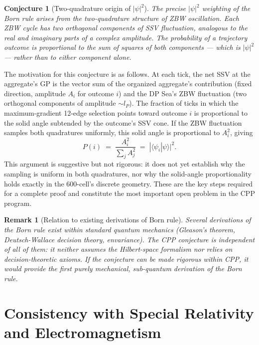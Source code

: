 \documentclass[12pt]{article}
\newtheorem{conjecture}[theorem]{Conjecture}
\newtheorem{remark}[theorem]{Remark}
\newcommand{\lP}{l_P}
\begin{document}
\begin{conjecture}[Two-quadrature origin of $|\psi|^2$]
\label{conj:born}
The precise $|\psi|^2$ weighting of the Born rule arises from the
two-quadrature structure of ZBW oscillation.  Each ZBW cycle has two
orthogonal components of SSV fluctuation, analogous to the real and imaginary
parts of a complex amplitude.  The probability of a trajectory outcome is
proportional to the sum of squares of both components --- which is
$|\psi|^2$ --- rather than to either component alone.
\end{conjecture}

The motivation for this conjecture is as follows.  At each tick, the net SSV
at the aggregate's GP is the vector sum of the organized aggregate's
contribution (fixed direction, amplitude $A_i$ for outcome $i$) and the DP
Sea's ZBW fluctuation (two orthogonal components of amplitude $\sim\lP$).
The fraction of ticks in which the maximum-gradient 12-edge selection points
toward outcome $i$ is proportional to the solid angle subtended by the
outcome's SSV cone.  If the ZBW fluctuation samples both quadratures
uniformly, this solid angle is proportional to $A_i^2$, giving
\begin{equation}
  P(i) \;=\; \frac{A_i^2}{\sum_j A_j^2}
  \;=\; |\langle\psi_i|\psi\rangle|^2.
  \label{eq:born}
\end{equation}
This argument is suggestive but not rigorous: it does not yet establish why
the sampling is uniform in both quadratures, nor why the solid-angle
proportionality holds exactly in the 600-cell's discrete geometry.  These
are the key steps required for a complete proof and constitute the most
important open problem in the CPP program.

\begin{remark}[Relation to existing derivations of Born rule]
Several derivations of the Born rule exist within standard quantum mechanics
(Gleason's theorem, Deutsch-Wallace decision theory, envariance).  The CPP
conjecture is independent of all of them: it neither assumes the Hilbert-space
formalism nor relies on decision-theoretic axioms.  If the conjecture can be
made rigorous within CPP, it would provide the first purely mechanical,
sub-quantum derivation of the Born rule.
\end{remark}

\section{Consistency with Special Relativity and Electromagnetism}
\label{sec:consistency}
\end{document}
